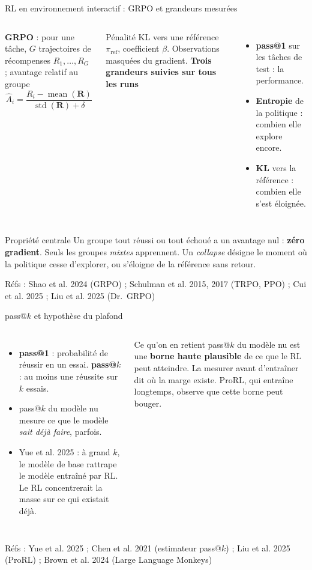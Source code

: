 \documentclass[aspectratio=169,10pt]{beamer}
\newcommand{\refs}[1]{\vfill{\tiny\textcolor{crMid}{Réfs : #1}}}
\newcommand{\hl}[1]{\textcolor{crOrange}{\textbf{#1}}}
\begin{document}
\begin{frame}{RL en environnement interactif : GRPO et grandeurs mesurées}
\begin{columns}[T]
\small
\textbf{GRPO} : pour une tâche, $G$ trajectoires de récompenses $R_1,\dots,R_G$ ; avantage relatif au groupe
\[ \hat A_i = \frac{R_i - \operatorname{mean}(\mathbf R)}{\operatorname{std}(\mathbf R)+\delta} \]
\vspace{-0.3cm}

Pénalité KL vers une référence $\pi_{\text{ref}}$, coefficient $\beta$. Observations masquées du gradient.
\small
\textbf{Trois grandeurs suivies sur tous les runs}
\begin{itemize}
  \item \hl{pass@1} sur les tâches de test : la performance.
  \item \hl{Entropie} de la politique : combien elle explore encore.
  \item \hl{KL} vers la référence : combien elle s'est éloignée.
\end{itemize}
\end{columns}
\vspace{0.15cm}
\begin{block}{Propriété centrale}
\small Un groupe tout réussi ou tout échoué a un avantage nul : \textbf{zéro gradient}. Seuls les groupes \emph{mixtes} apprennent. Un \emph{collapse} désigne le moment où la politique cesse d'explorer, ou s'éloigne de la référence sans retour.
\end{block}
\refs{Shao et al. 2024 (GRPO) ; Schulman et al. 2015, 2017 (TRPO, PPO) ; Cui et al. 2025 ; Liu et al. 2025 (Dr.~GRPO)}
\end{frame}

\begin{frame}{pass@$k$ et hypothèse du plafond}
\begin{columns}[T]
\begin{itemize}
  \item \textbf{pass@1} : probabilité de réussir en un essai. \textbf{pass@$k$} : au moins une réussite sur $k$ essais.
  \item pass@$k$ du modèle nu mesure ce que le modèle \emph{sait déjà faire}, parfois.
  \item Yue et al. 2025 : à grand $k$, le modèle de base rattrape le modèle entraîné par RL. Le RL concentrerait la masse sur ce qui existait déjà.
\end{itemize}
\begin{block}{Ce qu'on en retient}
pass@$k$ du modèle nu est une \textbf{borne haute plausible} de ce que le RL peut atteindre. La mesurer avant d'entraîner dit où la marge existe. ProRL, qui entraîne longtemps, observe que cette borne peut bouger.
\end{block}
\end{columns}
\refs{Yue et al. 2025 ; Chen et al. 2021 (estimateur pass@$k$) ; Liu et al. 2025 (ProRL) ; Brown et al. 2024 (Large Language Monkeys)}
\end{frame}
\end{document}
